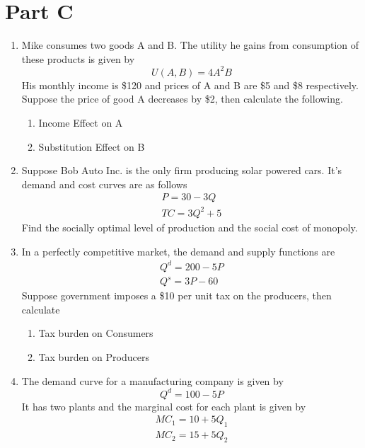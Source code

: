 \documentclass{article}
\begin{document}
\section*{Part C}
\begin{enumerate}
    \item 
        Mike consumes two goods A and B. The utility he gains from consumption of these products is given by 
        \[
        U(A,B) = 4A^2B
        \]
        His monthly income is \$120 and prices of A and B are \$5 and \$8 respectively. Suppose the price of good A decreases by \$2, then calculate the following. 
        \begin{enumerate}[label=(\roman*)]
            \item Income Effect on A
            \item Substitution Effect on B
        \end{enumerate}        
    \item 
        Suppose Bob Auto Inc. is the only firm producing solar powered cars. It's demand and cost curves are as follows 
        \begin{align}
            P=30-3Q \tag{1} \\
            TC=3Q^2+5 \tag{2} 
        \end{align}
        Find the socially optimal level of production and the social cost of monopoly. 
    \item 
        In a perfectly competitive market, the demand and supply functions are
        \begin{align}
            Q^d = 200-5P \tag{1} \\
            Q^s = 3P-60 \tag{2} 
        \end{align}
        Suppose government imposes a \$10 per unit tax on the producers, then calculate 
        \begin{enumerate}[label=(\roman*)]
            \item Tax burden on Consumers
            \item Tax burden on Producers
        \end{enumerate}
    \item 
        The demand curve for a manufacturing company is given by 
        \[
        Q^d = 100-5P
        \]
        It  has two plants and the marginal cost for each plant is given by 
        \begin{align*}
        MC_1 = 10+5Q_1 \\
        MC_2 = 15+5Q_2
        \end{align*}

\end{enumerate}
\end{document}
